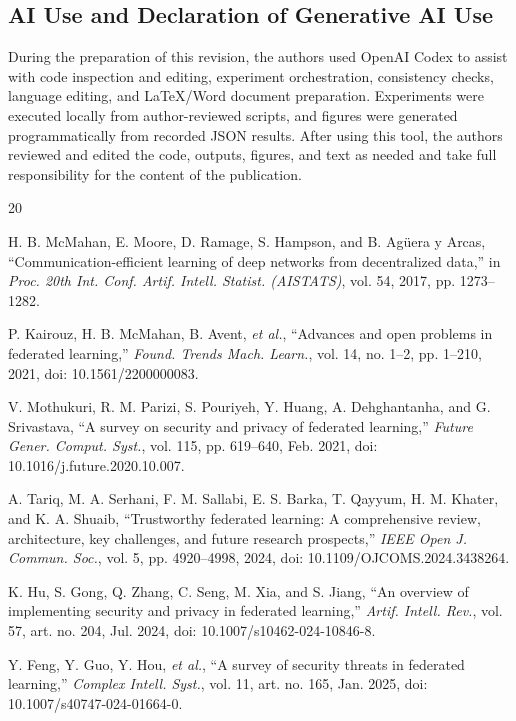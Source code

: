 \documentclass[10pt,letterpaper]{article}
\begin{document}
\subsection*{AI Use and Declaration of Generative AI Use}

During the preparation of this revision, the authors used OpenAI Codex to assist
with code inspection and editing, experiment orchestration, consistency checks,
language editing, and LaTeX/Word document preparation. Experiments were executed
locally from author-reviewed scripts, and figures were generated
programmatically from recorded JSON results. After using this tool, the authors
reviewed and edited the code, outputs, figures, and text as needed and take full
responsibility for the content of the publication.

\small
\begin{thebibliography}{20}

H. B. McMahan, E. Moore, D. Ramage, S. Hampson, and B. Ag\"uera y Arcas,
``Communication-efficient learning of deep networks from decentralized data,''
in \emph{Proc. 20th Int. Conf. Artif. Intell. Statist. (AISTATS)}, vol. 54,
2017, pp. 1273--1282.

P. Kairouz, H. B. McMahan, B. Avent, \emph{et al.},
``Advances and open problems in federated learning,''
\emph{Found. Trends Mach. Learn.}, vol. 14, no. 1--2, pp. 1--210, 2021,
doi: 10.1561/2200000083.

V. Mothukuri, R. M. Parizi, S. Pouriyeh, Y. Huang, A. Dehghantanha, and
G. Srivastava, ``A survey on security and privacy of federated learning,''
\emph{Future Gener. Comput. Syst.}, vol. 115, pp. 619--640, Feb. 2021,
doi: 10.1016/j.future.2020.10.007.

A. Tariq, M. A. Serhani, F. M. Sallabi, E. S. Barka, T. Qayyum, H. M. Khater,
and K. A. Shuaib, ``Trustworthy federated learning: A comprehensive review,
architecture, key challenges, and future research prospects,''
\emph{IEEE Open J. Commun. Soc.}, vol. 5, pp. 4920--4998, 2024,
doi: 10.1109/OJCOMS.2024.3438264.

K. Hu, S. Gong, Q. Zhang, C. Seng, M. Xia, and S. Jiang,
``An overview of implementing security and privacy in federated learning,''
\emph{Artif. Intell. Rev.}, vol. 57, art. no. 204, Jul. 2024,
doi: 10.1007/s10462-024-10846-8.

Y. Feng, Y. Guo, Y. Hou, \emph{et al.}, ``A survey of security threats in
federated learning,'' \emph{Complex Intell. Syst.}, vol. 11, art. no. 165,
Jan. 2025, doi: 10.1007/s40747-024-01664-0.


\end{thebibliography}
\end{document}
